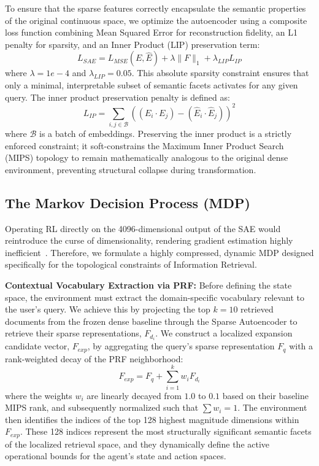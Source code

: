 To ensure that the sparse features correctly encapsulate the semantic properties of the original continuous space, we optimize the autoencoder using a composite loss function combining Mean Squared Error for reconstruction fidelity, an L1 penalty for sparsity, and an Inner Product (LIP) preservation term:
\begin{equation}
L_{SAE} = L_{MSE}(E, \hat{E}) + \lambda \|F\|_1 + \lambda_{LIP} L_{IP}
\end{equation}
where $\lambda = 1e-4$ and $\lambda_{LIP} = 0.05$. This absolute sparsity constraint ensures that only a minimal, interpretable subset of semantic facets activates for any given query. The inner product preservation penalty is defined as:
\begin{equation}
L_{IP} = \sum_{i, j \in \mathcal{B}} ((E_i \cdot E_j) - (\hat{E}_i \cdot \hat{E}_j))^2
\end{equation}
where $\mathcal{B}$ is a batch of embeddings. Preserving the inner product is a strictly enforced constraint; it soft-constrains the Maximum Inner Product Search (MIPS) topology to remain mathematically analogous to the original dense environment, preventing structural collapse during transformation.

\subsection{The Markov Decision Process (MDP)}
Operating RL directly on the 4096-dimensional output of the SAE would reintroduce the curse of dimensionality, rendering gradient estimation highly inefficient~\citep{lillicrap2016}. Therefore, we formulate a highly compressed, dynamic MDP designed specifically for the topological constraints of Information Retrieval.

\textbf{Contextual Vocabulary Extraction via PRF:} Before defining the state space, the environment must extract the domain-specific vocabulary relevant to the user's query. We achieve this by projecting the top $k=10$ retrieved documents from the frozen dense baseline through the Sparse Autoencoder to retrieve their sparse representations, $F_{d_i}$.
We construct a localized expansion candidate vector, $F_{exp}$, by aggregating the query's sparse representation $F_q$ with a rank-weighted decay of the PRF neighborhood:
\begin{equation}
F_{exp} = F_q + \sum_{i=1}^{k} w_i F_{d_i}
\end{equation}
where the weights $w_i$ are linearly decayed from $1.0$ to $0.1$ based on their baseline MIPS rank, and subsequently normalized such that $\sum w_i = 1$. The environment then identifies the indices of the top 128 highest magnitude dimensions within $F_{exp}$. These 128 indices represent the most structurally significant semantic facets of the localized retrieval space, and they dynamically define the active operational bounds for the agent's state and action spaces.


